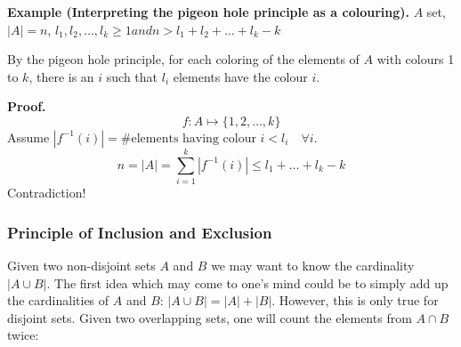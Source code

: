 \textbf{Example (Interpreting the pigeon hole principle as a colouring).}
$A$ set, $|A| = n$,
$l_1, l_2, \ldots, l_k ≥ 1 and n > l_1 + l_2 + \ldots + l_k - k$

By the pigeon hole principle, for each coloring of the elements of $A$ with colours 1 to $k$, there is an $i$ such that $l_i$ elements have the colour $i$.

\textbf{Proof.}
\[
    f: A\mapsto \{1,2,\ldots,k\}
\]
Assume
    $|f^{-1}(i)| = \text{\#elements having colour $i$} < l_i
    \quad\forall i$.
\[
	n = |A| = \sum_{i=1}^k |f^{-1}(i)| ≤ l_1 +\ldots + l_k - k
\]
Contradiction!


\subsubsection{Principle of Inclusion and Exclusion}

Given two non-disjoint sets $A$ and $B$  we may want to know the cardinality $|A \cup B|$.
The first idea which may come to one's mind could be to simply add up the cardinalities of $A$ and $B$:
$|A \cup B| = |A| + |B|$. However, this
is only true for disjoint sets. Given two overlapping sets, one will count the elements from
$A \cap B$ twice:

